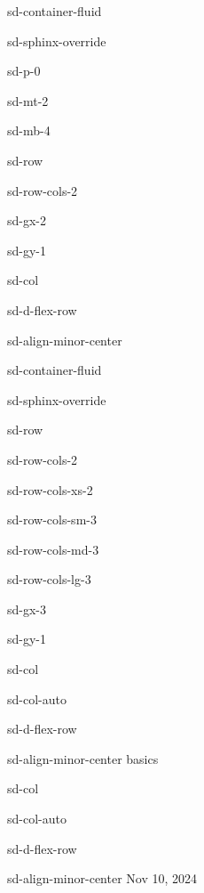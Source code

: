 \documentclass[letterpaper,10pt,english]{jupyterBook}
\begin{document}
\sphinxstepscope

\begin{sphinxuseclass}{sd-container-fluid}
\begin{sphinxuseclass}{sd-sphinx-override}
\begin{sphinxuseclass}{sd-p-0}
\begin{sphinxuseclass}{sd-mt-2}
\begin{sphinxuseclass}{sd-mb-4}
\begin{sphinxuseclass}{sd-row}
\begin{sphinxuseclass}{sd-row-cols-2}
\begin{sphinxuseclass}{sd-gx-2}
\begin{sphinxuseclass}{sd-gy-1}
\begin{sphinxuseclass}{sd-col}
\begin{sphinxuseclass}{sd-d-flex-row}
\begin{sphinxuseclass}{sd-align-minor-center}
\begin{sphinxuseclass}{sd-container-fluid}
\begin{sphinxuseclass}{sd-sphinx-override}
\begin{sphinxuseclass}{sd-row}
\begin{sphinxuseclass}{sd-row-cols-2}
\begin{sphinxuseclass}{sd-row-cols-xs-2}
\begin{sphinxuseclass}{sd-row-cols-sm-3}
\begin{sphinxuseclass}{sd-row-cols-md-3}
\begin{sphinxuseclass}{sd-row-cols-lg-3}
\begin{sphinxuseclass}{sd-gx-3}
\begin{sphinxuseclass}{sd-gy-1}
\begin{sphinxuseclass}{sd-col}
\begin{sphinxuseclass}{sd-col-auto}
\begin{sphinxuseclass}{sd-d-flex-row}
\begin{sphinxuseclass}{sd-align-minor-center}
\sphinxAtStartPar
basics

\end{sphinxuseclass}
\end{sphinxuseclass}
\end{sphinxuseclass}
\end{sphinxuseclass}
\begin{sphinxuseclass}{sd-col}
\begin{sphinxuseclass}{sd-col-auto}
\begin{sphinxuseclass}{sd-d-flex-row}
\begin{sphinxuseclass}{sd-align-minor-center}
\sphinxAtStartPar
Nov 10, 2024


\end{sphinxuseclass}
\end{sphinxuseclass}
\end{sphinxuseclass}
\end{sphinxuseclass}
\end{sphinxuseclass}
\end{sphinxuseclass}
\end{sphinxuseclass}
\end{sphinxuseclass}
\end{sphinxuseclass}
\end{sphinxuseclass}
\end{sphinxuseclass}
\end{sphinxuseclass}
\end{sphinxuseclass}
\end{sphinxuseclass}
\end{sphinxuseclass}
\end{sphinxuseclass}
\end{sphinxuseclass}
\end{sphinxuseclass}
\end{sphinxuseclass}
\end{sphinxuseclass}
\end{sphinxuseclass}
\end{sphinxuseclass}
\end{sphinxuseclass}
\end{sphinxuseclass}
\end{sphinxuseclass}
\end{sphinxuseclass}
\end{document}
